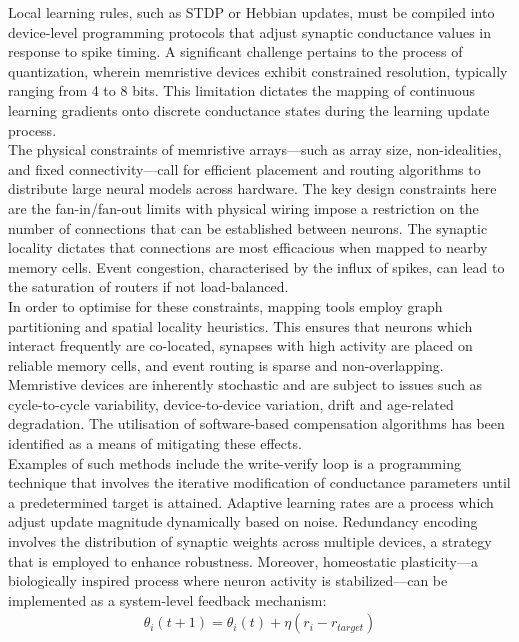 \noindent Local learning rules, such as STDP or Hebbian updates, must be compiled into device-level programming protocols that adjust synaptic conductance values in response to spike timing. A significant challenge pertains to the process of quantization, wherein memristive devices exhibit constrained resolution, typically ranging from 4 to 8 bits. This limitation dictates the mapping of continuous learning gradients onto discrete conductance states during the learning update process.\\

\noindent The physical constraints of memristive arrays—such as array size, non-idealities, and fixed connectivity—call for efficient placement and routing algorithms to distribute large neural models across hardware. The key design constraints here are the fan-in/fan-out limits with physical wiring impose a restriction on the number of connections that can be established between neurons. The synaptic locality dictates that connections are most efficacious when mapped to nearby memory cells. Event congestion, characterised by the influx of spikes, can lead to the saturation of routers if not load-balanced.\\

\noindent In order to optimise for these constraints, mapping tools employ graph partitioning and spatial locality heuristics. This ensures that neurons which interact frequently are co-located, synapses with high activity are placed on reliable memory cells, and event routing is sparse and non-overlapping. Memristive devices are inherently stochastic and are subject to issues such as cycle-to-cycle variability, device-to-device variation, drift and age-related degradation. The utilisation of software-based compensation algorithms has been identified as a means of mitigating these effects. \\

\noindent Examples of such methods include the write-verify loop is a programming technique that involves the iterative modification of conductance parameters until a predetermined target is attained. Adaptive learning rates are a process which adjust update magnitude dynamically based on noise. Redundancy encoding involves the distribution of synaptic weights across multiple devices, a strategy that is employed to enhance robustness. Moreover, homeostatic plasticity—a biologically inspired process where neuron activity is stabilized—can be implemented as a system-level feedback mechanism:
\begin{align}
    \theta_i(t + 1) = \theta_i(t) + \eta(r_i - r_{target}) \label{eq:2.43}
\end{align}

